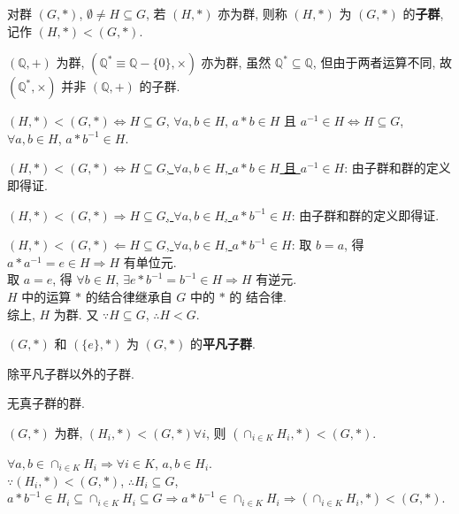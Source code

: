 \documentclass{note}
\begin{document}
\begin{df}[子群]
    对群 $(G,*)$, $\emptyset\neq H\subseteq G$, 若 $(H,*)$ 亦为群, 则称 $(H,*)$ 为 $(G,*)$ 的\textbf{子群}, 记作 $(H,*)<(G,*)$.
\end{df}

\begin{eg}
    $(\mathbb{Q},+)$ 为群, $(\mathbb{Q}^*\equiv\mathbb{Q}-\{0\},\times)$ 亦为群, 虽然 $\mathbb{Q}^*\subseteq\mathbb{Q}$, 但由于两者运算不同, 故 $(\mathbb{Q}^*,\times)$ 并非 $(\mathbb{Q},+)$ 的子群.
\end{eg}

\begin{thm}
    $(H,*)<(G,*)\Longleftrightarrow H\subseteq G$, $\forall a,b\in H$, $a*b\in H$ 且 $a^{-1}\in H\Longleftrightarrow H\subseteq G$, $\forall a,b\in H$, $a*b^{-1}\in H$.
\end{thm}
\begin{pf}
    \uline{$(H,*)<(G,*)\Longleftrightarrow H\subseteq G$, $\forall a,b\in H$, $a*b\in H$ 且 $a^{-1}\in H$}: 由子群和群的定义即得证.

    \uline{$(H,*)<(G,*)\Longrightarrow H\subseteq G$, $\forall a,b\in H$, $a*b^{-1}\in H$}: 由子群和群的定义即得证.

    \uline{$(H,*)<(G,*)\Longleftarrow H\subseteq G$, $\forall a,b\in H$, $a*b^{-1}\in H$}: 取 $b=a$, 得 $a*a^{-1}=e\in H\Longrightarrow H$ 有单位元.\\
    取 $a=e$, 得 $\forall b\in H$, $\exists e*b^{-1}=b^{-1}\in H\Longrightarrow H$ 有逆元.\\
    $H$ 中的运算 $*$ 的结合律继承自 $G$ 中的 $*$ 的 结合律.\\
    综上, $H$ 为群. 又 $\because H\subseteq G$, $\therefore H<G$.
\end{pf}

\begin{df}[平凡子群]
    $(G,*)$ 和 $(\{e\},*)$ 为 $(G,*)$ 的\textbf{平凡子群}.
\end{df}

\begin{df}
    除平凡子群以外的子群.
\end{df}

\begin{df}[单群]
    无真子群的群.
\end{df}

\begin{thm}[任意多个子群的交为子群]
    $(G,*)$ 为群, $(H_i,*)<(G,*)\forall i$, 则 $(\cap_{i\in K}H_i,*)<(G,*)$.
\end{thm}
\begin{pf}
    $\forall a,b\in\cap_{i\in K}H_i\Longrightarrow\forall i\in K$, $a,b\in H_i$.\\
    $\because(H_i,*)<(G,*)$, $\therefore H_i\subseteq G$, $a*b^{-1}\in H_i\subseteq\cap_{i\in K}H_i\subseteq G\Longrightarrow a*b^{-1}\in\cap_{i\in K}H_i\Longrightarrow(\cap_{i\in K}H_i,*)<(G,*)$.
\end{pf}
\end{document}
